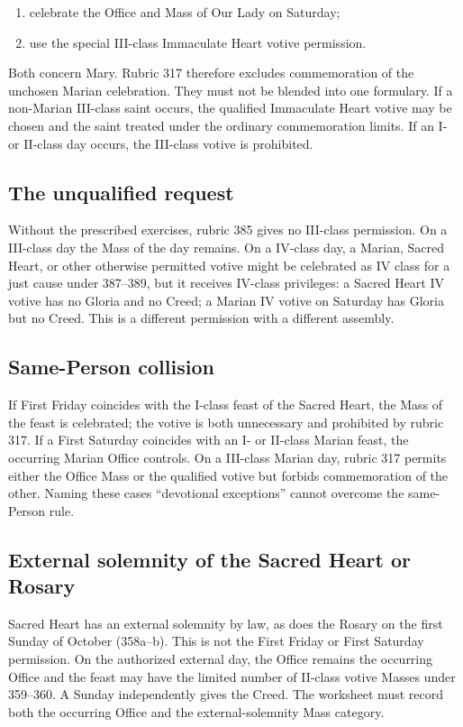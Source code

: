 \begin{enumerate}[leftmargin=1.45em]
\item celebrate the Office and Mass of Our Lady on Saturday;
\item use the special III-class Immaculate Heart votive permission.
\end{enumerate}

Both concern Mary. Rubric 317 therefore excludes commemoration of the unchosen Marian celebration. They must not be blended into one formulary. If a non-Marian III-class saint occurs, the qualified Immaculate Heart votive may be chosen and the saint treated under the ordinary commemoration limits. If an I- or II-class day occurs, the III-class votive is prohibited.

\subsection{The unqualified request}

Without the prescribed exercises, rubric 385 gives no III-class permission. On a III-class day the Mass of the day remains. On a IV-class day, a Marian, Sacred Heart, or other otherwise permitted votive might be celebrated as IV class for a just cause under 387--389, but it receives IV-class privileges: a Sacred Heart IV votive has no Gloria and no Creed; a Marian IV votive on Saturday has Gloria but no Creed. This is a different permission with a different assembly.

\subsection{Same-Person collision}

If First Friday coincides with the I-class feast of the Sacred Heart, the Mass of the feast is celebrated; the votive is both unnecessary and prohibited by rubric 317. If a First Saturday coincides with an I- or II-class Marian feast, the occurring Marian Office controls. On a III-class Marian day, rubric 317 permits either the Office Mass or the qualified votive but forbids commemoration of the other. Naming these cases “devotional exceptions” cannot overcome the same-Person rule.

\subsection{External solemnity of the Sacred Heart or Rosary}

Sacred Heart has an external solemnity by law, as does the Rosary on the first Sunday of October (358a--b). This is not the First Friday or First Saturday permission. On the authorized external day, the Office remains the occurring Office and the feast may have the limited number of II-class votive Masses under 359--360. A Sunday independently gives the Creed. The worksheet must record both the occurring Office and the external-solemnity Mass category.

